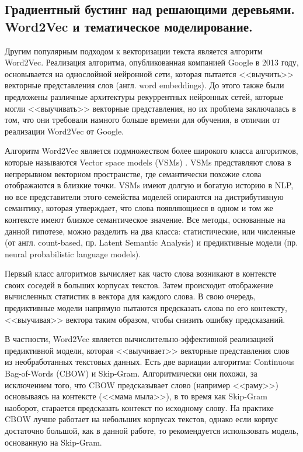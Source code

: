 \documentclass[a4paper, 14pt]{extarticle}
\begin{document}
\subsection{Градиентный бустинг над решающими деревьями. Word2Vec и тематическое моделирование.}
Другим популярным подходом к векторизации текста является алгоритм Word2Vec.
Реализация алгоритма, опубликованная компанией Google \cite{DBLP:journals/corr/abs-1301-3781} в 2013 году,
основывается на однослойной нейронной сети, которая пытается <<выучить>> векторные представления слов (англ. word embeddings).
До этого также были предложены различные архитектуры рекуррентных нейронных сетей, которые могли <<выучивать>> векторные 
представления, но их проблема заключалась в том, что они требовали намного больше времени для обучения, в отличии от реализации 
Word2Vec от Google.

Алгоритм Word2Vec является подмножеством более широкого класса алгоритмов, которые называются Vector space models (VSMs) 
\cite{Salton:1975:VSM:361219.361220}. VSMs представляют слова в непрерывном векторном пространстве, где семантически похожие
слова отображаются в близкие точки. VSMs имеют долгую и богатую историю в NLP, но все представители этого семейства моделей 
опираются на дистрибутивную семантику, которая утверждает, что слова появляющиеся в одном и том же контексте имеют близкое 
семантическое значение. Все методы, основанные на данной гипотезе, можно разделить на два класса: статистические, или численные (от 
англ. count-based, пр. Latent Semantic  Analysis) и предиктивные модели (пр. neural probabilistic language models).

Первый класс алгоритмов вычисляет как часто слова возникают в контексте своих соседей в больших корпусах текстов. Затем происходит
отображение вычисленных статистик в вектора для каждого слова. В свою очередь, предиктивные модели напрямую пытаются предсказать 
слова по его контексту, <<выучивая>> вектора таким образом, чтобы снизить ошибку предсказаний.

В частности, Word2Vec является вычислительно-эффективной реализацией предиктивной модели, которая <<выучивает>> векторные 
представления слов из необработанных текстовых данных. Есть две вариации алгоритма: Continuous Bag-of-Words (CBOW) и Skip-Gram. 
Алгоритмически они  похожи, за  исключением того, что CBOW предсказывает слово (например <<раму>>) основываясь на контексте (<<мама 
мыла>>), в то время как Skip-Gram наоборот, старается предсказать контекст по исходному слову. На практике CBOW лучше работает на 
небольших корпусах текстов, однако если  корпус достаточно большой, как в данной работе, то рекомендуется использовать модель, 
основанную на Skip-Gram.
\end{document}
